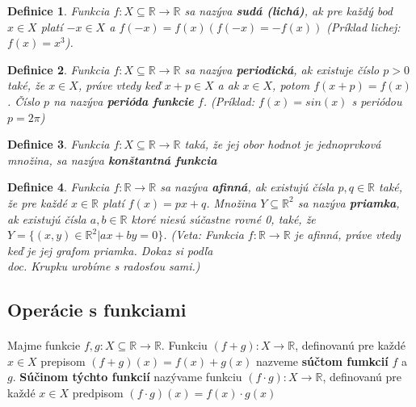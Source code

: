 \documentclass[12pt,a4paper]{article}
\newtheorem{definition}{Definice}
\begin{document}
\begin{definition}
	Funkcia $f: X \subseteq \mathds{R} \rightarrow \mathds{R}$ sa nazýva \textbf{sudá (lichá)}, ak pre každý bod $x\in X$ platí $-x\in X$ a $f(-x) = f(x) (f(-x) = -f(x))$ (Príklad lichej: $f(x)=x^{3}$).
\end{definition}

\begin{definition}
	Funkcia $f: X \subseteq \mathds{R} \rightarrow \mathds{R}$ sa nazýva \textbf{periodická}, ak existuje číslo $p>0$ také, že $x\in X$, práve vtedy keď $x+p \in X$ a ak $x\in X$, potom $f(x+p)=f(x)$. Číslo $p$ na nazýva \textbf{perióda funkcie} $f$. (Príklad: $f(x)=sin(x)$ s periódou $p=2\pi$) 
\end{definition}

\begin{definition}
	Funkcia $f: X \subseteq \mathds{R} \rightarrow \mathds{R}$ taká, že jej obor hodnot je jednoprvková množina, sa nazýva \textbf{konštantná funkcia}
\end{definition}

\begin{definition}
	Funkcia $f: \mathds{R} \rightarrow \mathds{R}$ sa nazýva \textbf{afinná}, ak existujú čísla $p,q \in \mathds{R}$ také, že pre každé $x \in \mathds{R}$ platí $f(x)=px+q$. Množina $Y\subseteq\mathds{R}^{2}$ sa nazýva \textbf{priamka}, ak existujú čísla $a, b \in \mathds{R}$ ktoré niesú súčastne rovné 0, také, že $Y=\{(x, y)\in\mathds{R}^{2}|ax+by=0\}$. (Veta: Funkcia $f: \mathds{R} \rightarrow \mathds{R}$ je afinná, práve vtedy keď je jej grafom priamka. Dokaz si podľa \\doc. Krupku urobíme s radosťou sami.)
\end{definition}

\subsection{Operácie s funkciami}
\paragraph{}
Majme funkcie $f, g: X\subseteq\mathds{R}\rightarrow\mathds{R}$. Funkciu $(f+g):X\rightarrow\mathds{R}$, definovanú pre každé $x\in X$ prepisom $(f + g)(x)=f(x)+g(x)$ nazveme \textbf{súčtom fumkcií} $f$ a $g$. \textbf{Súčinom týchto funkcií} nazývame funkciu $(f\cdot g):X\rightarrow\mathds{R}$, definovanú pre každé $x\in X$ predpisom $(f \cdot g)(x)=f(x)\cdot g(x)$
\end{document}
